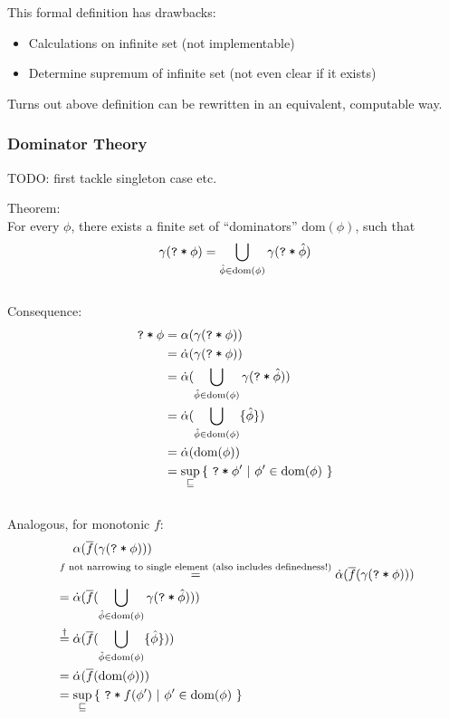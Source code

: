 \documentclass[11pt,a4paper]{article}
\newcommand{\ttt}{\texttt}
\newcommand{\dom}{\ensuremath{\textrm{dom}}}
\newcommand{\qm}{\ttt{?}}
\newcommand{\withqm}[1]{\ttt{\qm\:*\:$#1$}}
\begin{document}
This formal definition has drawbacks:
\begin{itemize}
    \item Calculations on infinite set (not implementable)
    \item Determine supremum of infinite set (not even clear if it exists)
\end{itemize}

Turns out above definition can be rewritten in an equivalent, computable way.

\subsubsection{Dominator Theory}
TODO: first tackle singleton case etc.

Theorem:\\
For every $\phi$, there exists a finite set of “dominators” $\dom(\phi)$, such that 
$$\gamma(\withqm{\phi}) = \bigcup_{\hat{\phi} \in \dom(\phi)} \gamma(\withqm{\hat{\phi}})$$
~\\

Consequence: 
\begin{align*}
\withqm{\phi} 
&= \alpha(\gamma(\withqm{\phi})) \\
&= \dalpha(\gamma(\withqm{\phi})) \\
&= \dalpha(\bigcup_{\hat{\phi} \in \dom(\phi)} \gamma(\withqm{\hat{\phi}})) \\
&= \dalpha(\bigcup_{\hat{\phi} \in \dom(\phi)} \{ \hat{\phi} \}) \\
&= \dalpha(\dom(\phi)) \\
&= \sup_{\sqsubseteq} {\{~ \withqm{\phi'} ~|~ \phi' \in \dom(\phi) ~\}}
\end{align*}
~\\
Analogous, for monotonic $f$: 
\begin{align*}
&~~~~ \alpha(\overline{f}(\gamma(\withqm{\phi}))) \\
&\overset{f \text{ not narrowing to single element (also includes definedness!)}}{=} \dalpha(\overline{f}(\gamma(\withqm{\phi}))) \\
&= \dalpha(\overline{f}(\bigcup_{\hat{\phi} \in \dom(\phi)} \gamma(\withqm{\hat{\phi}}))) \\
&\overset{\dagger}{=} \dalpha(\overline{f}(\bigcup_{\hat{\phi} \in \dom(\phi)} \{ \hat{\phi} \})) \\
&= \dalpha(\overline{f}(\dom(\phi))) \\
&= \sup_{\sqsubseteq} {\{~ \withqm{f(\phi')} ~|~ \phi' \in \dom(\phi) ~\}}
\end{align*}
\end{document}
